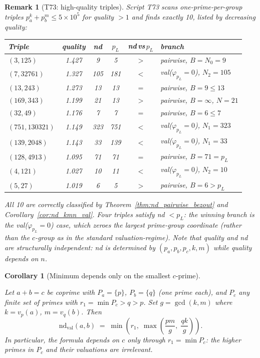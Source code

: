 \documentclass[12pt]{article}
\newtheorem{corollary}[theorem]{Corollary}
\newtheorem{remark}{Remark}
\theoremstyle{definition}
\begin{document}
\begin{remark}[T73: high-quality triples]\label{rem:t73_highqual}
  Script T73 scans one-prime-per-group triples $p_a^k + p_b^m \le 5\times 10^5$
  for quality $>1$ and finds exactly 10, listed by decreasing quality:
  \begin{center}
  {\small
  \begin{tabular}{lccccl}
  \hline
  Triple & quality & nd & $p_L$ & nd\,vs\,$p_L$ & branch \\
  \hline
  $(3,125)$   & 1.427 & 9   & 5   & $>$ & pairwise, $B=N_0=9$ \\
  $(7,32761)$ & 1.327 & 105 & 181 & $<$ & val($\varphi_{p_L}=0$), $N_2=105$ \\
  $(13,243)$  & 1.273 & 13  & 13  & $=$ & pairwise, $B=9\le 13$ \\
  $(169,343)$ & 1.199 & 21  & 13  & $>$ & pairwise, $B=\infty$, $N=21$ \\
  $(32,49)$   & 1.176 & 7   & 7   & $=$ & pairwise, $B=6\le 7$ \\
  $(751,130321)$ & 1.149 & 323 & 751 & $<$ & val($\varphi_{p_L}=0$), $N_1=323$ \\
  $(139,2048)$ & 1.143 & 33 & 139 & $<$ & val($\varphi_{p_L}=0$), $N_1=33$ \\
  $(128,4913)$ & 1.095 & 71  & 71  & $=$ & pairwise, $B=71=p_L$ \\
  $(4,121)$   & 1.027 & 10  & 11  & $<$ & val($\varphi_{p_L}=0$), $N_2=10$ \\
  $(5,27)$    & 1.019 & 6   & 5   & $>$ & pairwise, $B=6>p_L$ \\
  \hline
  \end{tabular}
  }
  \end{center}
  All 10 are correctly classified by Theorem~\ref{thm:nd_pairwise_bezout} and
  Corollary~\ref{cor:nd_kmn_val}.
  Four triples satisfy nd $< p_L$: the winning branch is the
  \emph{val($\varphi_{p_L}=0$)} case, which zeroes the \emph{largest}
  prime-group coordinate (rather than the $c$-group as in the standard
  valuation-regime).
  Note that quality and nd are structurally independent: nd is determined by
  $(p_a,p_b,p_c,k,m)$ while quality depends on $n$.
\end{remark}

\begin{corollary}[Minimum depends only on the smallest $c$-prime]\label{cor:nd_smallc}

  Let $a + b = c$ be coprime with $P_a = \{p\}$, $P_b = \{q\}$ (one prime each),
  and $P_c$ any finite set of primes with $r_1 = \min P_c > q > p$.
  Set $g = \gcd(k, m)$ where $k = v_p(a)$, $m = v_q(b)$.
  Then
  \[
    \mathrm{nd}_{\mathrm{val}}(a,b) \;=\; \min\!\left(r_1,\; \max\!\left(\frac{pm}{g},\;\frac{qk}{g}\right)\right).
  \]
  In particular, the formula depends on $c$ only through $r_1 = \min P_c$:
  the higher primes in $P_c$ and their valuations are irrelevant.
\end{corollary}
\end{document}
